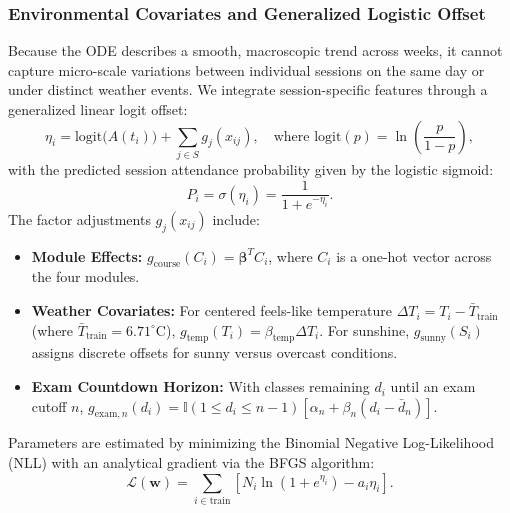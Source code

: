 \documentclass{article}
\begin{document}
\subsubsection{Environmental Covariates and Generalized Logistic Offset}
Because the ODE describes a smooth, macroscopic trend across weeks, it cannot capture micro-scale variations between individual sessions on the same day or under distinct weather events. We integrate session-specific features through a generalized linear logit offset:
\begin{equation}
    \eta_i = \mathrm{logit}\bigl( A(t_i) \bigr) + \sum_{j \in S} g_j(x_{ij}), \quad \text{where } \mathrm{logit}(p) = \ln\left(\frac{p}{1-p}\right),
    \label{eq:logit_offset}
\end{equation}
with the predicted session attendance probability given by the logistic sigmoid:
\begin{equation}
    P_i = \sigma(\eta_i) = \frac{1}{1 + e^{-\eta_i}}.
\end{equation}
The factor adjustments $g_j(x_{ij})$ include:
\begin{itemize}
    \item \textbf{Module Effects:} $g_{\mathrm{course}}(C_i) = \boldsymbol{\beta}^T C_i$, where $C_i$ is a one-hot vector across the four modules.
    \item \textbf{Weather Covariates:} For centered feels-like temperature $\Delta T_i = T_i - \bar{T}_{\mathrm{train}}$ (where $\bar{T}_{\mathrm{train}} = 6.71^\circ\mathrm{C}$), $g_{\mathrm{temp}}(T_i) = \beta_{\mathrm{temp}} \Delta T_i$. For sunshine, $g_{\mathrm{sunny}}(S_i)$ assigns discrete offsets for sunny versus overcast conditions.
    \item \textbf{Exam Countdown Horizon:} With classes remaining $d_i$ until an exam cutoff $n$, $g_{\mathrm{exam}, n}(d_i) = \mathbb{I}(1 \le d_i \le n-1) \left[ \alpha_n + \beta_n (d_i - \bar{d}_n) \right]$.
\end{itemize}
Parameters are estimated by minimizing the Binomial Negative Log-Likelihood (NLL) with an analytical gradient via the BFGS algorithm:
\begin{equation}
    \mathcal{L}(\mathbf{w}) = \sum_{i \in \mathrm{train}} \left[ N_i \ln\left(1 + e^{\eta_i}\right) - a_i \eta_i \right].
    \label{eq:nll}
\end{equation}
\end{document}
